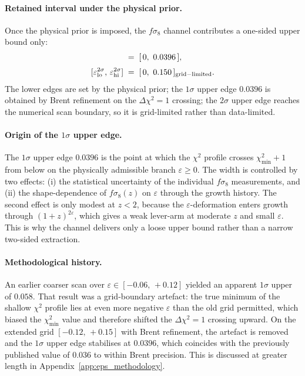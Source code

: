 \paragraph{Retained interval under the physical prior.}
Once the physical prior is imposed, the $f\sigma_8$ channel
contributes a one-sided upper bound only:
\begin{align}
[\varepsilon_{\rm lo}^{1\sigma},\,\varepsilon_{\rm hi}^{1\sigma}]
&\;=\;
[\,0,\ 0.0396\,],
\label{eq:eps_fsigma8_retained}
\\[2pt]
[\varepsilon_{\rm lo}^{2\sigma},\,\varepsilon_{\rm hi}^{2\sigma}]
&\;=\;
[\,0,\ 0.150\,]_{\rm grid-limited}.
\end{align}
The lower edges are set by the physical prior; the $1\sigma$
upper edge $0.0396$ is obtained by Brent refinement on the
$\Delta\chi^2 = 1$ crossing; the $2\sigma$ upper edge reaches the
numerical scan boundary, so it is grid-limited rather than
data-limited.

\paragraph{Origin of the $1\sigma$ upper edge.}
The $1\sigma$ upper edge $0.0396$ is the point at which the
$\chi^2$ profile crosses $\chi^2_{\min} + 1$ from below on the
physically admissible branch $\varepsilon \geq 0$. The width is
controlled by two effects: (i) the statistical uncertainty of the
individual $f\sigma_8$ measurements, and (ii) the shape-dependence
of $f\sigma_8(z)$ on $\varepsilon$ through the growth history.
The second effect is only modest at $z < 2$, because the
$\varepsilon$-deformation enters growth through
$(1 + z)^{2\varepsilon}$, which gives a weak lever-arm at moderate
$z$ and small $\varepsilon$. This is why the channel delivers
only a loose upper bound rather than a narrow two-sided
extraction.

\paragraph{Methodological history.}
An earlier coarser scan over $\varepsilon \in [-0.06,\,+0.12]$
yielded an apparent $1\sigma$ upper of $0.058$. That result was
a grid-boundary artefact: the true minimum of the shallow
$\chi^2$ profile lies at even more negative $\varepsilon$ than
the old grid permitted, which biased the $\chi^2_{\min}$ value
and therefore shifted the $\Delta\chi^2 = 1$ crossing upward. On
the extended grid $[-0.12,\,+0.15]$ with Brent refinement, the
artefact is removed and the $1\sigma$ upper edge stabilises at
$0.0396$, which coincides with the previously published value of
$0.036$ to within Brent precision. This is discussed at greater
length in Appendix~\ref{app:eps_methodology}.

